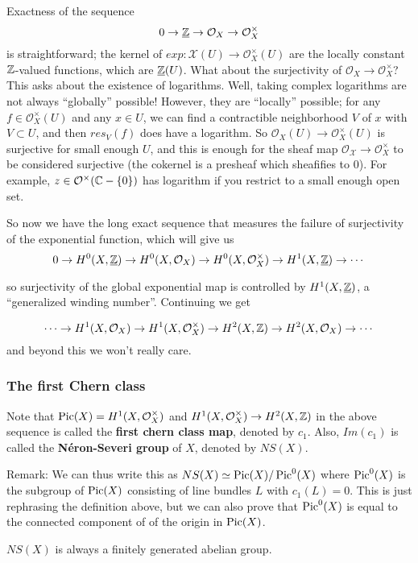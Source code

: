 Exactness of the sequence 
$$0\to \underline{{\mathbb Z}}\to \mathcal{O}_X\to \mathcal{O}_X^\times$$
is straightforward; the kernel of $exp:\mathcal{X}(U)\to \mathcal{O}_X^\times(U)$ are the locally constant ${\mathbb Z}$-valued functions, which are $\underline{{\mathbb Z}}(U)$. What about the surjectivity of $\mathcal{O}_X\to \mathcal{O}_X^\times$? This asks about the existence of logarithms. Well, taking complex logarithms are not always ``globally'' possible! However, they are ``locally'' possible; for any $f\in \mathcal{O}_X^\times(U)$ and any $x\in U$, we can find a contractible neighborhood $V$ of $x$ with $V\subset U$, and then $res_V(f)$ does have a logarithm. So $\mathcal{O}_X(U)\to \mathcal{O}_X^\times (U)$ is surjective for small enough $U$, and this is enough for the sheaf map $\mathcal{O_X}\to \mathcal{O}_X^\times$ to be considered surjective (the cokernel is a presheaf which sheafifies to $0$).
For example, $z\in \mathcal{O}^\times({\mathbb C}-\{0\})$ has logarithm if you restrict to a small enough open set. 

So now we have the long exact sequence that measures the failure of surjectivity of the exponential function, which will give us 
$$0\to H^0(X,\underline{{\mathbb Z}})\to H^0(X,\mathcal{O}_X)\to H^0(X,\mathcal{O}_X^\times)\to H^1(X,\underline{{\mathbb Z}})\to \cdots$$

so surjectivity of the global exponential map is controlled by $H^1(X,\underline{{\mathbb Z}})$, a ``generalized winding number''. Continuing we get

$$\cdots\to H^1(X,\mathcal{O}_X)\to H^1(X,\mathcal{O}_X^\times) \to H^2(X,{\mathbb Z})\to H^2(X,\mathcal{O}_X)\to \cdots$$
and beyond this we won't really care.

\subsubsection{The first Chern class}
Note that $\operatorname{Pic}(X)=H^1(X,\mathcal{O}_X^\times)$ and $H^1(X,\mathcal{O}_X^\times) \to H^2(X,{\mathbb Z})$ in the above sequence is called the \textbf{first chern class map}, denoted by $c_1$. Also, $Im(c_1)$ is called the \textbf{N\'{e}ron-Severi group} of $X$, denoted by $NS(X)$. 

Remark: We can thus write this as $NS(X)\simeq \operatorname{Pic}(X)/\operatorname{Pic}^0(X)$ where $\operatorname{Pic}^0(X)$ is the subgroup of $\operatorname{Pic}(X)$ consisting of line bundles $L$ with $c_1(L)=0$. This is just rephrasing the definition above, but we can also prove that $\operatorname{Pic}^0(X)$ is equal to the connected component of of the origin in $\operatorname{Pic}(X)$.

\begin{theorem}
$NS(X)$ is always a finitely generated abelian group.
\end{theorem}

